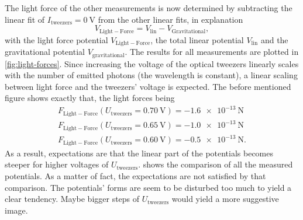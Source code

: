\documentclass[../bericht.tex]{subfiles}
\begin{document}
      The light force of the other measurements is now determined by subtracting the linear fit of $I_\mathrm{tweezers}=\SI{0}{\volt}$ from the other linear fits, in explanation
      \begin{equation}
          V_\mathrm{Light-Force} = V_\mathrm{lin} - V_\mathrm{Gravitational},
          \label{eq:light-forces}
      \end{equation}
      with the light force potential $V_\mathrm{Light-Force}$, the total linear potential $V_\mathrm{lin}$ and the gravitational potential $V_\mathrm{gravitational}$. The results for all measurements are plotted in \cref{fig:light-forces}. Since increasing the voltage of the optical tweezers linearly scales with the number of emitted photons (the wavelength is constant), a linear scaling between light force and the tweezers' voltage is expected. The before mentioned figure shows exactly that, the light forces being
      \begin{align*}
        F_\mathrm{Light-Force}(U_\mathrm{tweezers}=\SI{0,70}{\volt})=\SI{-1,6e-13}{\newton} \\
        F_\mathrm{Light-Force}(U_\mathrm{tweezers}=\SI{0,65}{\volt})=\SI{-1,0e-13}{\newton} \\
        F_\mathrm{Light-Force}(U_\mathrm{tweezers}=\SI{0,60}{\volt})=\SI{-0,5e-13}{\newton} .
      \end{align*}
      As a result, expectations are that the linear part of the potentials becomes steeper for higher voltages of $U_\mathrm{tweezers}$.  shows the comparison of all the measured potentials. As a matter of fact, the expectations are not satisfied by that comparison. The potentials' forms are seem to be disturbed too much to yield a clear tendency. Maybe bigger steps of $U_\mathrm{tweezers}$ would yield a more suggestive image.
      \medskip
\end{document}
